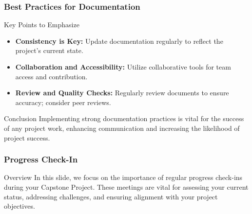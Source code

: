 \documentclass[aspectratio=169]{beamer}
\begin{document}
\begin{frame}[fragile]
    \frametitle{Best Practices for Documentation}
    \begin{block}{Key Points to Emphasize}
        \begin{itemize}
            \item \textbf{Consistency is Key:} Update documentation regularly to reflect the project's current state.
            \item \textbf{Collaboration and Accessibility:} Utilize collaborative tools for team access and contribution.
            \item \textbf{Review and Quality Checks:} Regularly review documents to ensure accuracy; consider peer reviews.
        \end{itemize}
    \end{block}
    \begin{block}{Conclusion}
        Implementing strong documentation practices is vital for the success of any project work, enhancing communication and increasing the likelihood of project success.
    \end{block}
\end{frame}

\begin{frame}[fragile]
    \frametitle{Progress Check-In}
    \begin{block}{Overview}
        In this slide, we focus on the importance of regular progress check-ins during your Capstone Project. These meetings are vital for assessing your current status, addressing challenges, and ensuring alignment with your project objectives.
    \end{block}
\end{frame}
\end{document}
